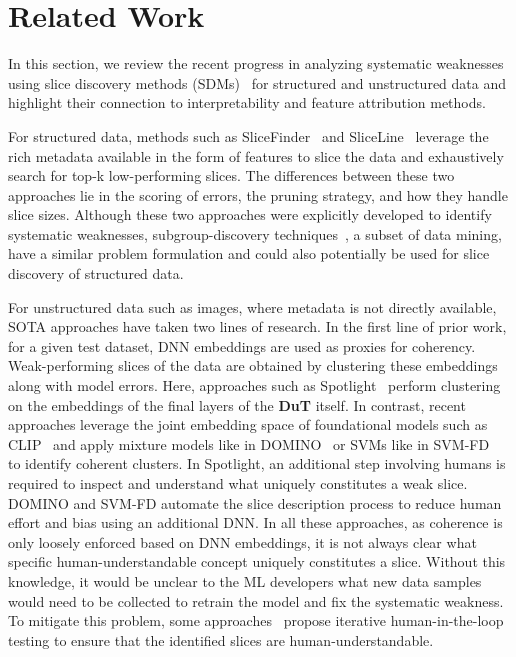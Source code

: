 \section{Related Work}
\label{sec:related_work}

In this section, we review the recent progress in analyzing systematic weaknesses using slice discovery methods (SDMs)~\citep{eyuboglu2022domino} for structured and unstructured data and highlight their connection to interpretability and feature attribution methods.  

For structured data, methods such as SliceFinder~\citep{chung2019slice} and SliceLine~\citep{sagadeeva2021sliceline} leverage the rich metadata available in the form of features to slice the data and exhaustively search for top-k low-performing slices. The differences between these two approaches lie in the scoring of errors, the pruning strategy, and how they handle slice sizes. 
Although these two approaches were explicitly developed to identify systematic weaknesses, subgroup-discovery techniques~\citep{atzmueller2015subgroup}, a subset of data mining, have a similar problem formulation and could also potentially be used for slice discovery of structured data. 

For unstructured data such as images, where metadata is not directly available, SOTA approaches have taken two lines of research. In the first line of prior work, for a given test dataset, DNN embeddings are used as proxies for coherency. Weak-performing slices of the data are obtained by clustering these embeddings along with model errors. 
Here, approaches such as Spotlight~\citep{d2022spotlight} perform clustering on the embeddings of the final layers of the \textbf{DuT} itself. In contrast, recent approaches leverage the joint embedding space of foundational models such as CLIP~\citep{radford2021learning} and apply mixture models like in DOMINO~\citep{eyuboglu2022domino} or SVMs like in SVM-FD~\citep{jain2023distilling} to identify coherent clusters. In Spotlight, an additional step involving humans is required to inspect and understand what uniquely constitutes a weak slice. 
DOMINO and SVM-FD automate the slice description process to reduce human effort and bias using an additional DNN. 
In all these approaches, as coherence is only loosely enforced based on DNN embeddings, it is not always clear what specific human-understandable concept uniquely constitutes a slice. Without this knowledge, it would be unclear to the ML developers what new data samples would need to be collected to retrain the model and fix the systematic weakness. 
To mitigate this problem, some approaches~\citep{gao2023adaptive, slyman2023vlslice} propose iterative human-in-the-loop testing to ensure that the identified slices are human-understandable. 
 
